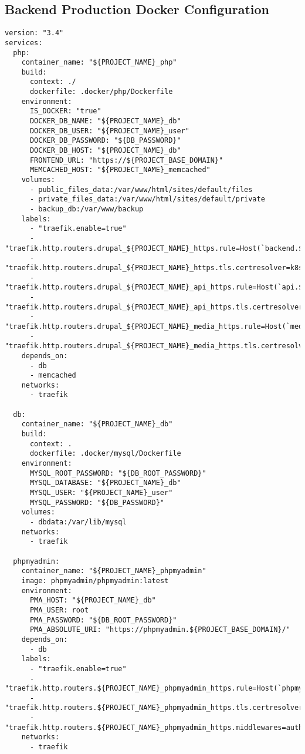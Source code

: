 \subsection{Backend Production Docker Configuration}
\label{appendix:backend_docker_prod}


\begin{lstlisting}[caption={Backend Production Configuration}, captionpos=b, breaklines=true]
version: "3.4"
services:
  php:
    container_name: "${PROJECT_NAME}_php"
    build:
      context: ./
      dockerfile: .docker/php/Dockerfile
    environment:
      IS_DOCKER: "true"
      DOCKER_DB_NAME: "${PROJECT_NAME}_db"
      DOCKER_DB_USER: "${PROJECT_NAME}_user"
      DOCKER_DB_PASSWORD: "${DB_PASSWORD}"
      DOCKER_DB_HOST: "${PROJECT_NAME}_db"
      FRONTEND_URL: "https://${PROJECT_BASE_DOMAIN}"
      MEMCACHED_HOST: "${PROJECT_NAME}_memcached"
    volumes:
      - public_files_data:/var/www/html/sites/default/files
      - private_files_data:/var/www/html/sites/default/private
      - backup_db:/var/www/backup
    labels:
      - "traefik.enable=true"
      - "traefik.http.routers.drupal_${PROJECT_NAME}_https.rule=Host(`backend.${PROJECT_BASE_DOMAIN}`)"
      - "traefik.http.routers.drupal_${PROJECT_NAME}_https.tls.certresolver=k8spreprodchallenge"
      - "traefik.http.routers.drupal_${PROJECT_NAME}_api_https.rule=Host(`api.${PROJECT_BASE_DOMAIN}`)"
      - "traefik.http.routers.drupal_${PROJECT_NAME}_api_https.tls.certresolver=k8spreprodchallenge"
      - "traefik.http.routers.drupal_${PROJECT_NAME}_media_https.rule=Host(`media.${PROJECT_BASE_DOMAIN}`)"
      - "traefik.http.routers.drupal_${PROJECT_NAME}_media_https.tls.certresolver=k8spreprodchallenge"
    depends_on:
      - db
      - memcached
    networks:
      - traefik

  db:
    container_name: "${PROJECT_NAME}_db"
    build:
      context: .
      dockerfile: .docker/mysql/Dockerfile
    environment:
      MYSQL_ROOT_PASSWORD: "${DB_ROOT_PASSWORD}"
      MYSQL_DATABASE: "${PROJECT_NAME}_db"
      MYSQL_USER: "${PROJECT_NAME}_user"
      MYSQL_PASSWORD: "${DB_PASSWORD}"
    volumes:
      - dbdata:/var/lib/mysql
    networks:
      - traefik

  phpmyadmin:
    container_name: "${PROJECT_NAME}_phpmyadmin"
    image: phpmyadmin/phpmyadmin:latest
    environment:
      PMA_HOST: "${PROJECT_NAME}_db"
      PMA_USER: root
      PMA_PASSWORD: "${DB_ROOT_PASSWORD}"
      PMA_ABSOLUTE_URI: "https://phpmyadmin.${PROJECT_BASE_DOMAIN}/"
    depends_on:
      - db
    labels:
      - "traefik.enable=true"
      - "traefik.http.routers.${PROJECT_NAME}_phpmyadmin_https.rule=Host(`phpmyadmin.${PROJECT_BASE_DOMAIN}`)"
      - "traefik.http.routers.${PROJECT_NAME}_phpmyadmin_https.tls.certresolver=k8spreprodchallenge"
      - "traefik.http.routers.${PROJECT_NAME}_phpmyadmin_https.middlewares=auth"
    networks:
      - traefik


\end{lstlisting}

